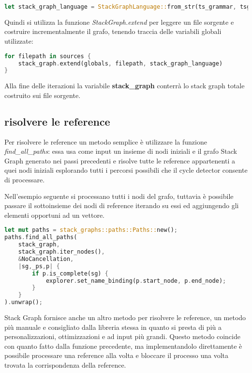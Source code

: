 \begin{lstlisting}[language=Rust]
let stack_graph_language = StackGraphLanguage::from_str(ts_grammar, tsg_grammar).unwrap();
\end{lstlisting}

Quindi si utilizza la funzione \emph{StackGraph.extend} per leggere un file sorgente e costruire incrementalmente il grafo, tenendo traccia delle variabili globali utilizzate:

\begin{lstlisting}[language=Rust]
for filepath in sources {
    stack_graph.extend(globals, filepath, stack_graph_language)
}
\end{lstlisting}

Alla fine delle iterazioni la variabile \textbf{stack\_graph} conterr\`a lo stack graph totale costruito sui file sorgente.

\subsection{risolvere le reference}

Per risolvere le reference un metodo semplice \`e utilizzare la funzione \emph{find\_all\_paths}: essa usa come input un insieme di nodi iniziali e il grafo Stack Graph generato nei passi precedenti e risolve tutte le reference appartenenti a quei nodi iniziali esplorando tutti i percorsi possibili che il cycle detector consente di processare.

Nell'esempio seguente si processano tutti i nodi del grafo, tuttavia \`e possibile passare il sottoinsieme dei nodi di reference iterando su essi ed aggiungendo gli elementi opportuni ad un vettore.

\begin{lstlisting}[language=Rust]
let mut paths = stack_graphs::paths::Paths::new();
paths.find_all_paths(
    stack_graph,
    stack_graph.iter_nodes(),
    &NoCancellation,
    |sg,_ps,p| {
        if p.is_complete(sg) {
            explorer.set_name_binding(p.start_node, p.end_node);
        }
    }
).unwrap();
\end{lstlisting}

Stack Graph fornisce anche un altro metodo per risolvere le reference, un metodo pi\`u manuale e consigliato dalla libreria stessa in quanto si presta di pi\`u a personalizzazioni, ottimizzazioni e ad input pi\`u grandi.
Questo metodo coincide con quanto fatto dalla funzione precedente, ma implementandolo direttamente \`e possibile processare una reference alla volta e bloccare il processo una volta trovata la corrispondenza della reference.

